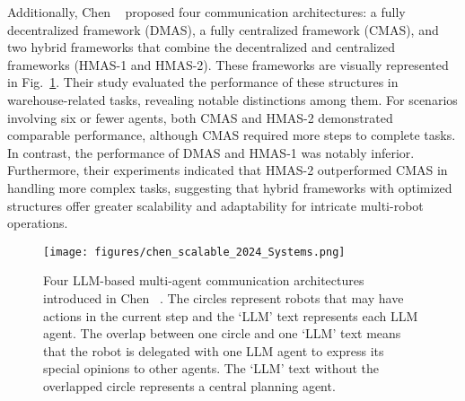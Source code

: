 
Additionally, Chen \etal~\cite{chen_scalable_2024} proposed four communication architectures: a fully decentralized framework (DMAS), a fully centralized framework (CMAS), and two hybrid frameworks that combine the decentralized and centralized frameworks (HMAS-1 and HMAS-2). These frameworks are visually represented in Fig.~\ref{fig:scalable_sec3}. Their study evaluated the performance of these structures in warehouse-related tasks, revealing notable distinctions among them. For scenarios involving six or fewer agents, both CMAS and HMAS-2 demonstrated comparable performance, although CMAS required more steps to complete tasks. In contrast, the performance of DMAS and HMAS-1 was notably inferior. Furthermore, their experiments indicated that HMAS-2 outperformed CMAS in handling more complex tasks, suggesting that hybrid frameworks with optimized structures offer greater scalability and adaptability for intricate multi-robot operations.

\begin{figure}[h]
    \centering
    \texttt{[image: figures/chen\_scalable\_2024\_Systems.png]}
    \caption{Four LLM-based multi-agent communication architectures introduced in Chen \etal~\cite{chen_scalable_2024}. The circles represent robots that may have actions in the current step and the `LLM' text represents each LLM agent. The overlap between one circle and one `LLM' text means that the robot is delegated with one LLM agent to express its special opinions to other agents. The `LLM' text without the overlapped circle represents a central planning agent.}
    \label{fig:scalable_sec3}
\end{figure}

